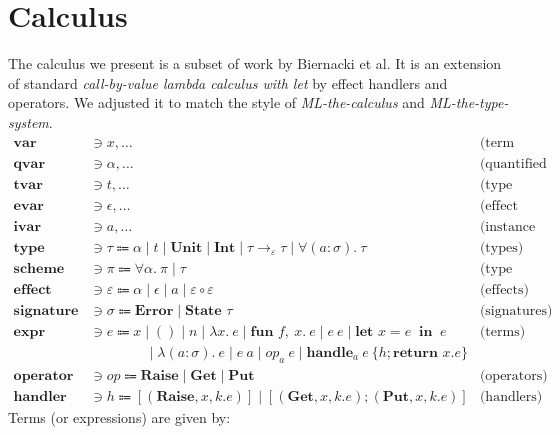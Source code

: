 \documentclass[declaration,shortabstract]{iithesis}
\theoremstyle{definition} \newtheorem{definition}{Definition}[section]
\newcommand{\arrow}[3]{{#1}\rightarrow_{#2}{#3}}
\newcommand{\lam}[1][x]{\ensuremath{\lambda #1.\:}}
\newcommand{\fun}[1][f,\:x]{\ensuremath{\textbf{fun } #1.\:}}
\begin{document}
\chapter{Calculus}
The calculus we present is a subset of work by Biernacki et al\cite{binders-labels}.
It is an extension of standard \textit{call-by-value lambda calculus with let} by effect handlers and operators. 
We adjusted it to match the style of \textit{ML-the-calculus} and \textit{ML-the-type-system}\cite{emlti}. 
\begin{align*} 
\textbf{var} & \ni x , \dots & \text{(term variables)}
\\ 
\textbf{qvar} & \ni \alpha , \dots & \text{(quantified variables)}
\\ 
\textbf{tvar} & \ni t , \dots & \text{(type variables)}
\\ 
\textbf{evar} & \ni \epsilon , \dots & \text{(effect variables)}
\\ 
\textbf{ivar} & \ni a , \dots & \text{(instance variables)}
\\ 
\textbf{type} & \ni \tau \Coloneqq
\alpha \mid t \mid \textbf{Unit} \mid \textbf{Int} \mid \arrow{\tau}{\varepsilon}{\tau}
\mid \forall (a : \sigma) .\: \tau
 & \text{(types)}
\\
\textbf{scheme} & \ni \pi \Coloneqq \forall \alpha.\:\pi \mid \tau &\text{(type schemes)}
\\ 
\textbf{effect} & \ni \varepsilon \Coloneqq 
\alpha \mid \epsilon \mid a \mid \varepsilon \circ \varepsilon 
 & \text{(effects)}
\\ 
\textbf{signature} & \ni \sigma \Coloneqq \textbf{Error} \mid \textbf{State } \tau& \text{(signatures)}
\\
\textbf{expr} & \ni e \Coloneqq x \mid () \mid n \mid \lam e \mid \fun e \mid e \: e \mid \textbf{let } x = e \: \textbf{ in } \: e & \text{(terms)}
\\
 & \qquad\qquad \mid \lam[(a : \sigma)] e \mid e \: a \mid op_a \: e \mid \textbf{handle}_a \: e\: \{h; \textbf{return } x. e\}
\\
\textbf{operator} & \ni op \Coloneqq \textbf{Raise} \mid \textbf{Get} \mid \textbf{Put} & \text{(operators)} 
\\ 
\textbf{handler} & \ni h \Coloneqq [(\textbf{Raise}, x, k. e)] \mid [(\textbf{Get}, x, k. e); (\textbf{Put}, x, k. e)]& \text{(handlers)}
\end{align*}
Terms (or expressions) are given by:
\end{document}
